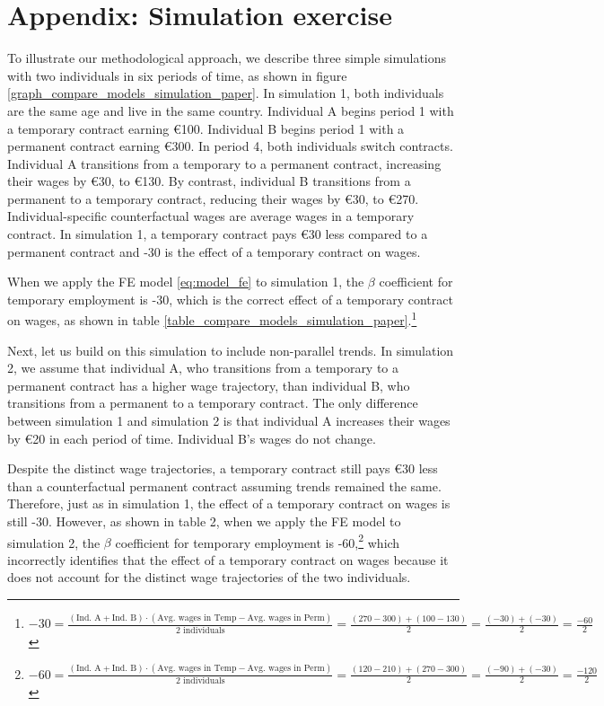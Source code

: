\section{Appendix: Simulation exercise}\label{appendix:simulation}
\setcounter{figure}{0}    
\setcounter{table}{0}    
\renewcommand*\thetable{\Alph{section}.\arabic{table}}
\renewcommand*\thefigure{\Alph{section}.\arabic{figure}}
\renewcommand{\theHfigure}{\Alph{section}.\arabic{table}}
\renewcommand{\theHtable}{\Alph{section}.\arabic{figure}}

To illustrate our methodological approach, we describe three simple simulations with two individuals in six periods of time, as shown in figure \ref{graph_compare_models_simulation_paper}. In simulation 1, both individuals are the same age and live in the same country. Individual A begins period 1 with a temporary contract earning €100. Individual B begins period 1 with a permanent contract earning €300. In period 4, both individuals switch contracts. Individual A transitions from a temporary to a permanent contract, increasing their wages by €30, to €130. By contrast, individual B transitions from a permanent to a temporary contract, reducing their wages by €30, to €270. Individual-specific counterfactual wages are average wages in a temporary contract. In simulation 1, a temporary contract pays €30 less compared to a permanent contract and -30 is the effect of a temporary contract on wages.

When we apply the FE model \ref{eq:model_fe} to simulation 1, the $\beta$ coefficient for temporary employment is -30, which is the correct effect of a temporary contract on wages, as shown in table \ref{table_compare_models_simulation_paper}.\footnote{$-30 = \frac{(\text{Ind. A} + \text{Ind. B}) \cdot (\text{Avg. wages in Temp} - \text{Avg. wages in Perm})}{2 \text{ individuals}} = \frac{(270-300) + (100-130)}{2} = \frac{(-30) + (-30)}{2} = \frac{-60}{2}$}

Next, let us build on this simulation to include non-parallel trends.  In simulation 2, we assume that individual A, who transitions from a temporary to a permanent contract has a higher wage trajectory, than individual B, who transitions from a permanent to a temporary contract.  The only difference between simulation 1 and simulation 2 is that individual A increases their wages by €20 in each period of time.  Individual B's wages do not change.

Despite the distinct wage trajectories, a temporary contract still pays €30 less than a counterfactual permanent contract assuming trends remained the same.  Therefore, just as in simulation 1, the effect of a temporary contract on wages is still -30.  However, as shown in table 2, when we apply the FE model to simulation 2, the $\beta$  coefficient for temporary employment is -60,\footnote{$-60 = \frac{(\text{Ind. A} + \text{Ind. B}) \cdot (\text{Avg. wages in Temp} - \text{Avg. wages in Perm})}{2 \text{ individuals}} = \frac{(120-210) + (270-300)}{2} = \frac{(-90) + (-30)}{2} = \frac{-120}{2}$} which incorrectly identifies that the effect of a temporary contract on wages because it does not account for the distinct wage trajectories of the two individuals.  

